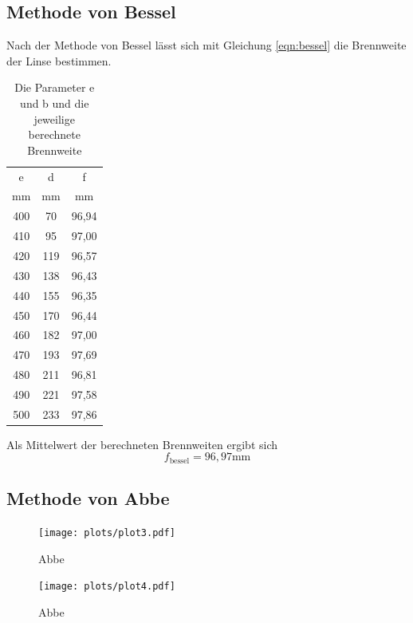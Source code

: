 \subsection{Methode von Bessel}
Nach der Methode von Bessel lässt sich mit Gleichung \ref{eqn:bessel} die Brennweite der Linse bestimmen.
\begin{table}[H]
    \centering
    \begin{tabular}{c c | c }
        \toprule
        e & d & f\\
        mm & mm & mm\\
        \midrule
        400 & 70 & 96,94\\
        410 & 95 & 97,00\\
        420 & 119& 96,57\\
        430 & 138& 96,43\\
        440 & 155& 96,35\\
        450 & 170& 96,44\\
        460 & 182& 97,00\\
        470 & 193& 97,69\\
        480 & 211& 96,81\\
        490 & 221& 97,58\\
        500 & 233& 97,86 \\
        \bottomrule
    \end{tabular}
    \caption{Die Parameter e und b und die jeweilige berechnete Brennweite}
    \label{tab:tab1}
\end{table}
Als Mittelwert der berechneten Brennweiten ergibt sich
\begin{equation}
    f_{\text{bessel}} = 96,97 \text{mm}
\end{equation}
\subsection{Methode von Abbe}
\begin{figure}[H]
    \centering
    \texttt{[image: plots/plot3.pdf]}
    \caption{Abbe}
\end{figure}
\begin{figure}[H]
    \centering
    \texttt{[image: plots/plot4.pdf]}
    \caption{Abbe}
\end{figure}